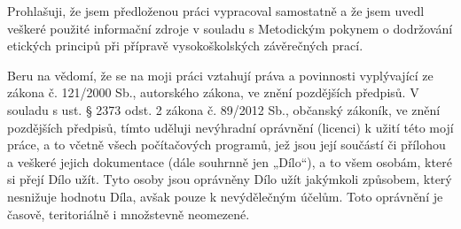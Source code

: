 \documentclass[czech,bachelor,unicode]{template/ctufit-thesis}
\theoremstyle{plain}
\theoremstyle{definition}
\theoremstyle{remark}
\numberwithin{theorem}{chapter}
\begin{document}
\begin{declarationpage}
    Prohlašuji, že jsem předloženou práci vypracoval samostatně a že jsem uvedl veškeré
    použité informační zdroje v souladu s Metodickým pokynem o dodržování etických
    principů při přípravě vysokoškolských závěrečných prací.

    Beru na vědomí, že se na moji práci vztahují práva a povinnosti vyplývající ze zákona
    č. 121/2000 Sb., autorského zákona, ve znění pozdějších předpisů. V souladu s ust.
    § 2373 odst. 2 zákona č. 89/2012 Sb., občanský zákoník, ve znění pozdějších předpisů,
    tímto uděluji nevýhradní oprávnění (licenci) k užití této mojí práce, a to včetně všech
    počítačových programů, jež jsou její součástí či přílohou a veškeré jejich
    dokumentace (dále souhrnně jen „Dílo“), a to všem osobám, které si přejí Dílo užít.
    Tyto osoby jsou oprávněny Dílo užít jakýmkoli způsobem, který nesnižuje hodnotu
    Díla, avšak pouze k nevýdělečným účelům. Toto oprávnění je časově, teritoriálně
    i množstevně neomezené.
\end{declarationpage}

\printabstractpage %

%
%
%
%
%
%
%
%
%
\end{document}
